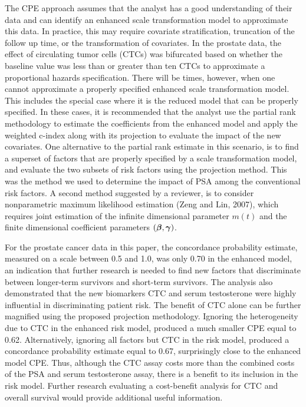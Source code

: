 \documentclass[12pt]{article}
\newcommand{\bg}{\mbox{\boldmath $\gamma$}}
\newcommand{\bb}{\mbox{\boldmath $\beta$}}
\begin{document}
The CPE approach assumes that the analyst has a good understanding of their data and can identify an enhanced scale transformation model to approximate this data. In practice, this may require covariate stratification, truncation of the follow up time, or the transformation of covariates. In the prostate data, the effect of circulating tumor cells (CTCs) was bifurcated based on whether the baseline value was less than or greater than ten CTCs to approximate a proportional hazards specification. There will be times, however, when one cannot approximate a properly specified enhanced scale transformation model. This includes the special case where it is the reduced model that can be properly specified. In these cases, it is recommended that the analyst use the partial rank methodology to estimate the coefficients from the enhanced model and apply the weighted c-index along with its projection to evaluate the impact of the new covariates. One alternative to the partial rank estimate in this scenario,  is to find a superset of factors that are properly specified by a scale transformation model, and evaluate the two subsets of risk factors using the projection method. This was the method we used to determine the impact of PSA among the conventional risk factors. A second method suggested by a reviewer, is to consider nonparametric maximum likelihood estimation (Zeng and Lin, 2007), which requires joint estimation of the infinite dimensional parameter $m(t)$ and the finite dimensional coefficient parameters $(\bb, \bg)$. 

For the prostate cancer data in this paper, the concordance probability estimate, measured on a scale between 0.5 and 1.0, was only 0.70 in the enhanced model, an indication that further research is needed to find new factors that discriminate between longer-term survivors and short-term survivors. The analysis also demonstrated that the new biomarkers CTC and serum testosterone were highly influential in discriminating patient risk. The benefit of CTC alone can be further magnified using the proposed projection methodology. Ignoring the heterogeneity due to CTC in the enhanced risk model, produced a much smaller CPE equal to 0.62. Alternatively, ignoring all factors but CTC in the risk model, produced a concordance probability estimate equal to 0.67, surprisingly close to the enhanced model CPE.  Thus, although the CTC assay costs more than the combined costs of the PSA and serum testosterone assay, there is a benefit to its inclusion in the risk model. Further research evaluating  a cost-benefit analysis for CTC and overall survival would provide additional useful information. 
\end{document}
